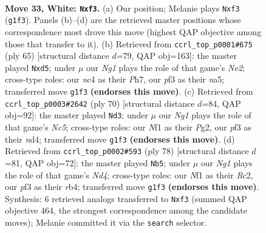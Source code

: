\documentclass[11pt]{article}
\begin{document}
\clearpage

\begin{figure}[p]\centering
\begin{subfigure}{0.46\textwidth}\centering
\resizebox{\linewidth}{!}{%
\newchessgame
\chessboard[
  setfen={r1b1k3/8/8/1P4r1/p1n1p2p/3p1p1P/5RPR/K4NN1 w q - 0 33},
  showmover=false,
  pgfstyle=straightmove, color=movearrow, markmove={g1-f3}
]}
\caption{}
\end{subfigure}\hfill
\begin{subfigure}{0.46\textwidth}\centering
\resizebox{\linewidth}{!}{%
\newchessgame
\chessboard[
  setfen={2r5/p3n1kp/2pr1p2/N2P2p1/1P4P1/P7/4R2P/2R3K1 b - - 2 33},
  showmover=false,
  pgfstyle=straightmove, color=movearrow, markmove={e7-d5}
]}
\caption{}
\end{subfigure}
\\[4pt]
\begin{subfigure}{0.46\textwidth}\centering
\resizebox{\linewidth}{!}{%
\newchessgame
\chessboard[
  setfen={6k1/5r2/8/2N1p2p/3nPp2/5Pp1/r1PR2PP/3R3K w - - 0 36},
  showmover=false,
  pgfstyle=straightmove, color=movearrow, markmove={c5-d3}
]}
\caption{}
\end{subfigure}\hfill
\begin{subfigure}{0.46\textwidth}\centering
\resizebox{\linewidth}{!}{%
\newchessgame
\chessboard[
  setfen={8/r2pnk2/4p3/p1R2pP1/PrPN1P1p/8/2R2K1P/8 w - - 3 40},
  showmover=false,
  pgfstyle=straightmove, color=movearrow, markmove={d4-b5}
]}
\caption{}
\end{subfigure}
\caption{\textbf{Move 33, White: \texttt{Nxf3}.} (a) Our position; Melanie plays \texttt{Nxf3} (\texttt{g1f3}). Panels (b)--(d) are the retrieved master positions whose correspondence most drove this move (highest QAP objective among those that transfer to it). (b) Retrieved from \texttt{ccrl\_top\_p0001\#675} (ply 65) [structural distance $d$=79, QAP obj=163]: the master played \texttt{Nxd5}; under $\mu$ our \emph{Ng1} plays the role of that game's \emph{Ne2}; cross-type roles: our \emph{n}c4 as their \emph{P}h7, our \emph{p}f3 as their \emph{n}a5; transferred move \texttt{g1f3} \textbf{(endorses this move)}. (c) Retrieved from \texttt{ccrl\_top\_p0003\#2642} (ply 70) [structural distance $d$=84, QAP obj=92]: the master played \texttt{Nd3}; under $\mu$ our \emph{Ng1} plays the role of that game's \emph{Nc5}; cross-type roles: our \emph{N}f1 as their \emph{P}g2, our \emph{p}f3 as their \emph{n}d4; transferred move \texttt{g1f3} \textbf{(endorses this move)}. (d) Retrieved from \texttt{ccrl\_top\_p0002\#593} (ply 78) [structural distance $d$=81, QAP obj=72]: the master played \texttt{Nb5}; under $\mu$ our \emph{Ng1} plays the role of that game's \emph{Nd4}; cross-type roles: our \emph{N}f1 as their \emph{R}c2, our \emph{p}f3 as their \emph{r}b4; transferred move \texttt{g1f3} \textbf{(endorses this move)}. Synthesis: 6 retrieved analogs transferred to \texttt{Nxf3} (summed QAP objective 464, the strongest correspondence among the candidate moves); Melanie committed it via the \texttt{search} selector.}
\label{fig:thought-m64}
\end{figure}
\end{document}
